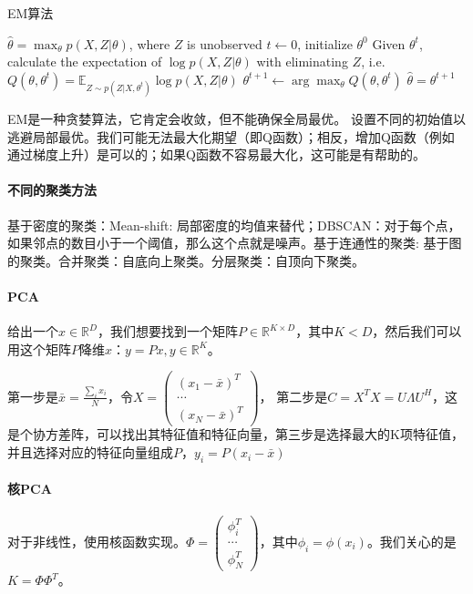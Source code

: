 \begin{algorithm}[H]
\caption{EM算法}
\label{alg:EM}
\begin{algorithmic}[1]
\Require $\hat{\theta} = \max_\theta p(X,Z|\theta)$, where $Z$ is unobserved
\State $t \leftarrow 0$, initialize $\theta^0$
\Repeat
\State Given $\theta^t$, calculate the expectation of $\log p(X, Z|\theta)$ with eliminating $Z$, i.e. $Q(\theta, \theta^t) = \mathbb{E}_{Z\sim p(Z|X, \theta^t)}\log p(X, Z|\theta)$
\State $\theta^{t+1} \leftarrow \arg \max_{\theta} Q(\theta, \theta^t)$
\State $\hat{\theta} = \theta^{t+1}$
\end{algorithmic}
\end{algorithm}

EM是一种贪婪算法，它肯定会收敛，但不能确保全局最优。
设置不同的初始值以逃避局部最优。我们可能无法最大化期望（即Q函数）；相反，增加Q函数（例如通过梯度上升）是可以的；如果Q函数不容易最大化，这可能是有帮助的。

\paragraph{不同的聚类方法}
基于密度的聚类：Mean-shift: 局部密度的均值来替代；DBSCAN：对于每个点，如果邻点的数目小于一个阈值，那么这个点就是噪声。基于连通性的聚类: 基于图的聚类。合并聚类：自底向上聚类。分层聚类：自顶向下聚类。

\paragraph{PCA}
给出一个$x\in \mathbb{R}^D$，我们想要找到一个矩阵$P \in \mathbb{R}^{K \times D}$，其中$K < D$，然后我们可以用这个矩阵$P$降维$x$：$y = Px, y \in \mathbb{R}^K$。

第一步是$\bar{x} = \frac{\sum_i x_i}{N}$，令$X = \begin{pmatrix}
    (x_1 - \bar{x})^T \\
    \cdots \\
    (x_N - \bar{x})^T
\end{pmatrix}$，
第二步是$C = X^TX = U\Lambda U^H$，这是个协方差阵，可以找出其特征值和特征向量，第三步是选择最大的K项特征值，并且选择对应的特征向量组成$P$，$y_i = P(x_i - \bar{x})$

\paragraph{核PCA}
对于非线性，使用核函数实现。$\Phi = \begin{pmatrix}
    \phi_i^T \\
    \cdots \\
    \phi_N^T
\end{pmatrix}$，其中$\phi_i = \phi(x_i)$。我们关心的是$K = \Phi\Phi^T$。

